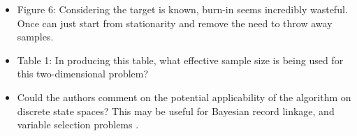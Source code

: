 \documentclass[12pt]{article}
\begin{document}
\begin{itemize}
	\item Figure 6: Considering the target is known, burn-in seems incredibly wasteful. Once can just start from stationarity and remove the need to throw away samples.
	
	\item Table 1: In producing this table, what effective sample size is being used for this two-dimensional problem?
	
	\item Could the authors comment on the potential applicability of the algorithm on discrete state spaces? This may be useful for Bayesian record linkage, and variable selection problems \citep{zanella2020informed}.
	
	
\end{itemize}


%
%
%
\end{document}
